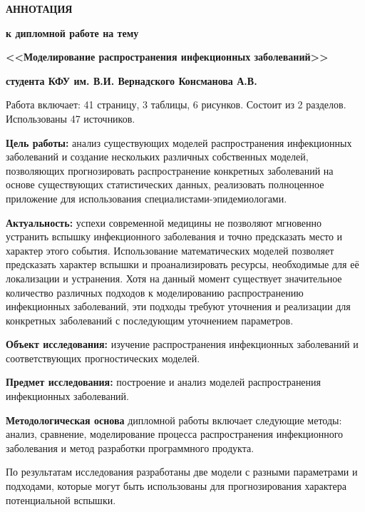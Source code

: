 \documentclass[a4paper,14pt,russian]{extreport}	%
\begin{document}
	\begin{center}
		\textbf{АННОТАЦИЯ}
		
		\textbf{к дипломной работе на тему}
		
		\textbf{<<Моделирование распространения инфекционных заболеваний>> }
		
		\textbf{студента КФУ им. В.И. Вернадского Консманова А.В.}
	\end{center}

Работа включает: 41 страницу, 3 таблицы, 6 рисунков. Состоит из 2 разделов. Использованы 47 источников. 

\textbf{Цель работы:} анализ существующих моделей распространения инфекционных заболеваний и  создание нескольких различных собственных моделей, позволяющих прогнозировать распространение конкретных заболеваний на основе существующих статистических данных, реализовать полноценное приложение для использования  специалистами-эпидемиологами.

\textbf{Актуальность:} успехи современной медицины не позволяют мгновенно устранить вспышку инфекционного заболевания и точно предсказать место и характер этого события. Использование математических моделей позволяет предсказать характер вспышки и проанализировать ресурсы, необходимые для её локализации и устранения. Хотя на данный момент существует значительное  количество различных подходов к моделированию распространению инфекционных заболеваний, эти подходы требуют уточнения и реализации для конкретных заболеваний с последующим уточнением параметров.

\textbf{Объект исследования:} изучение распространения инфекционных заболеваний и соответствующих прогностических моделей.

\textbf{Предмет исследования:} построение и анализ моделей распространения инфекционных заболеваний.

\textbf{Методологическая основа} дипломной работы включает следующие методы: анализ, сравнение, моделирование процесса распространения инфекционного заболевания и метод разработки программного продукта.

По результатам исследования разработаны две модели с разными параметрами и подходами, которые могут быть использованы для прогнозирования характера потенциальной вспышки.
\end{document}
